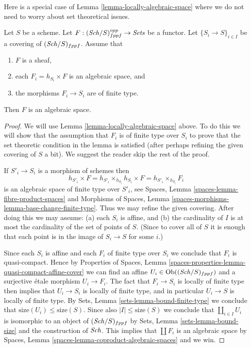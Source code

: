 \noindent
Here is a special case of Lemma \ref{lemma-locally-algebraic-space}
where we do not need to worry about set theoretical issues.

\begin{lemma}
\label{lemma-locally-algebraic-space-finite-type}
Let $S$ be a scheme.
Let $F : (\mathit{Sch}/S)_{fppf}^{opp} \to \textit{Sets}$ be a functor.
Let $\{S_i \to S\}_{i \in I}$ be a covering of $(\mathit{Sch}/S)_{fppf}$.
Assume that
\begin{enumerate}
\item $F$ is a sheaf,
\item each $F_i = h_{S_i} \times F$ is an algebraic space, and
\item the morphisms $F_i \to S_i$ are of finite type.
\end{enumerate}
Then $F$ is an algebraic space.
\end{lemma}

\begin{proof}
We will use
Lemma \ref{lemma-locally-algebraic-space}
above. To do this we will show that the assumption that
$F_i$ is of finite type over $S_i$ to prove that the set theoretic
condition in the lemma is satisfied (after perhaps refining the given
covering of $S$ a bit).
We suggest the reader skip the rest of the proof.

\medskip\noindent
If $S'_i \to S_i$ is a morphism of schemes then
$$
h_{S'_i} \times F =
h_{S'_i} \times_{h_{S_i}} h_{S_i} \times F =
h_{S'_i} \times_{h_{S_i}} F_i
$$
is an algebraic space of finite type over $S'_i$, see
Spaces, Lemma \ref{spaces-lemma-fibre-product-spaces}
and
Morphisms of Spaces,
Lemma \ref{spaces-morphisms-lemma-base-change-finite-type}.
Thus we may refine the given covering. After doing this we may assume:
(a) each $S_i$ is affine, and (b) the cardinality of $I$ is at most
the cardinality of the set of points of $S$. (Since to cover
all of $S$ it is enough that each point is in the image of $S_i \to S$
for some $i$.)

\medskip\noindent
Since each $S_i$ is affine and each $F_i$ of finite type over $S_i$
we conclude that $F_i$ is quasi-compact. Hence by
Properties of Spaces,
Lemma \ref{spaces-properties-lemma-quasi-compact-affine-cover}
we can find an affine $U_i \in \mathop{\mathrm{Ob}}\nolimits((\mathit{Sch}/S)_{fppf})$
and a surjective \'etale morphism $U_i \to F_i$. The fact that
$F_i \to S_i$ is locally of finite type then implies that
$U_i \to S_i$ is locally of finite type, and in particular
$U_i \to S$ is locally of finite type. By
Sets, Lemma \ref{sets-lemma-bound-finite-type}
we conclude that $\text{size}(U_i) \leq \text{size}(S)$.
Since also $|I| \leq \text{size}(S)$ we conclude that
$\coprod_{i \in I} U_i$ is isomorphic to an object of
$(\mathit{Sch}/S)_{fppf}$ by
Sets, Lemma \ref{sets-lemma-bound-size}
and the construction of $\mathit{Sch}$. This implies that
$\coprod F_i$ is an algebraic space by
Spaces, Lemma \ref{spaces-lemma-coproduct-algebraic-spaces}
and we win.
\end{proof}

